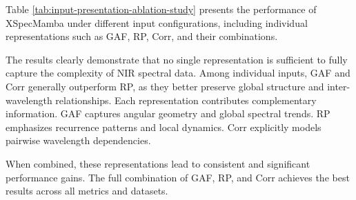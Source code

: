 \documentclass[pdflatex,sn-mathphys-num]{sn-jnl}%
\begin{document}
Table \ref{tab:input-presentation-ablation-study} presents the performance of XSpecMamba under different input configurations, including individual representations such as GAF, RP, Corr, and their combinations.

The results clearly demonstrate that no single representation is sufficient to fully capture the complexity of NIR spectral data. Among individual inputs, GAF and Corr generally outperform RP, as they better preserve global structure and inter-wavelength relationships. Each representation contributes complementary information. GAF captures angular geometry and global spectral trends. RP emphasizes recurrence patterns and local dynamics. Corr explicitly models pairwise wavelength dependencies.

When combined, these representations lead to consistent and significant performance gains. The full combination of GAF, RP, and Corr achieves the best results across all metrics and datasets.
\end{document}

